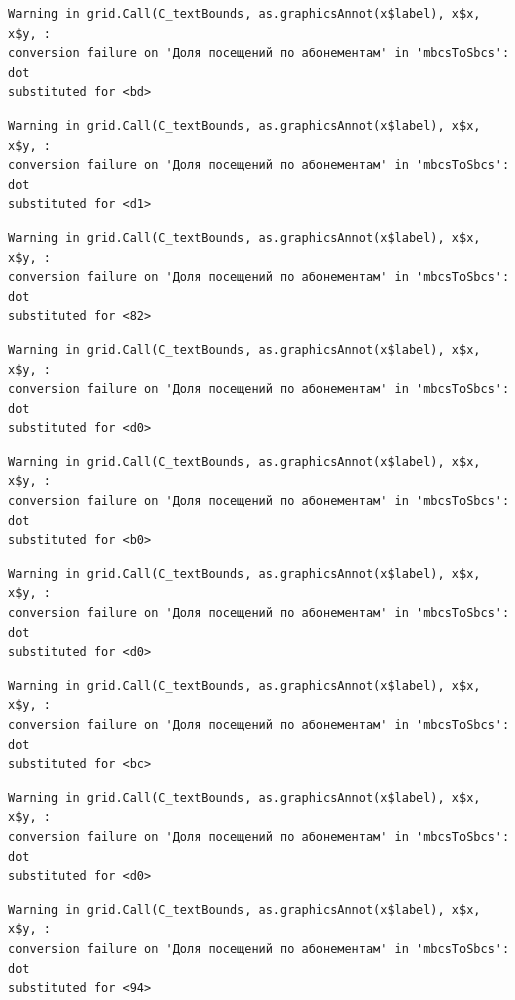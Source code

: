 \documentclass[
  letterpaper,
  DIV=11,
  numbers=noendperiod]{scrartcl}
\begin{document}
\begin{verbatim}
Warning in grid.Call(C_textBounds, as.graphicsAnnot(x$label), x$x, x$y, :
conversion failure on 'Доля посещений по абонементам' in 'mbcsToSbcs': dot
substituted for <bd>
\end{verbatim}

\begin{verbatim}
Warning in grid.Call(C_textBounds, as.graphicsAnnot(x$label), x$x, x$y, :
conversion failure on 'Доля посещений по абонементам' in 'mbcsToSbcs': dot
substituted for <d1>
\end{verbatim}

\begin{verbatim}
Warning in grid.Call(C_textBounds, as.graphicsAnnot(x$label), x$x, x$y, :
conversion failure on 'Доля посещений по абонементам' in 'mbcsToSbcs': dot
substituted for <82>
\end{verbatim}

\begin{verbatim}
Warning in grid.Call(C_textBounds, as.graphicsAnnot(x$label), x$x, x$y, :
conversion failure on 'Доля посещений по абонементам' in 'mbcsToSbcs': dot
substituted for <d0>
\end{verbatim}

\begin{verbatim}
Warning in grid.Call(C_textBounds, as.graphicsAnnot(x$label), x$x, x$y, :
conversion failure on 'Доля посещений по абонементам' in 'mbcsToSbcs': dot
substituted for <b0>
\end{verbatim}

\begin{verbatim}
Warning in grid.Call(C_textBounds, as.graphicsAnnot(x$label), x$x, x$y, :
conversion failure on 'Доля посещений по абонементам' in 'mbcsToSbcs': dot
substituted for <d0>
\end{verbatim}

\begin{verbatim}
Warning in grid.Call(C_textBounds, as.graphicsAnnot(x$label), x$x, x$y, :
conversion failure on 'Доля посещений по абонементам' in 'mbcsToSbcs': dot
substituted for <bc>
\end{verbatim}

\begin{verbatim}
Warning in grid.Call(C_textBounds, as.graphicsAnnot(x$label), x$x, x$y, :
conversion failure on 'Доля посещений по абонементам' in 'mbcsToSbcs': dot
substituted for <d0>
\end{verbatim}

\begin{verbatim}
Warning in grid.Call(C_textBounds, as.graphicsAnnot(x$label), x$x, x$y, :
conversion failure on 'Доля посещений по абонементам' in 'mbcsToSbcs': dot
substituted for <94>
\end{verbatim}
\end{document}
